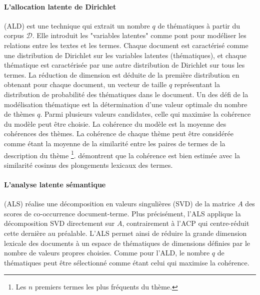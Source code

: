 \paragraph[LDA]{L'allocation latente de Dirichlet}
(ALD) \citep{blei2003lda} est une technique qui extrait un nombre $q$ de thématiques à partir du corpus $\mathcal{D}$. Elle introduit les "variables latentes" comme pont pour modéliser les relations entre les textes et les termes. Chaque document est caractérisé comme une distribution de Dirichlet sur les variables latentes (thématiques), et chaque thématique est caractérisée par une autre distribution de Dirichlet sur tous les termes. La réduction de dimension est déduite de la première distribution en obtenant pour chaque document, un vecteur de taille $q$ représentant la distribution de probabilité des thématiques dans le document. Un des défi de la modélisation thématique est la détermination d'une valeur optimale du nombre de thèmes $q$. Parmi plusieurs valeurs candidates, celle qui maximise la cohérence du modèle peut être choisie. La cohérence du modèle est la moyenne des  cohérences des thèmes. La cohérence de chaque thème peut être considérée comme étant la moyenne de la similarité entre les paires de termes de la description du thème \footnote{Les $n$ premiers termes les plus fréquents du thème.}. \citet{fang2016w2v_for_topiccoherence} démontrent que la cohérence est bien estimée avec la similarité cosinus des plongements lexicaux des termes.%

\paragraph[LSA]{L'analyse latente sémantique}
(ALS) \citep{dumais1988LSI, deerwester1990indexingbyLSA} réalise une décomposition en valeurs singulières (SVD) de la matrice $A$ des scores de co-occurrence document-terme. Plus précisément, l'ALS applique la décomposition SVD directement sur $A$, contrairement à l'ACP qui centre-réduit cette dernière au préalable. L'ALS permet ainsi de réduire la grande dimension lexicale des documents à un espace de thématiques de dimensions définies par le nombre de valeurs propres choisies. Comme pour l'ALD, le nombre $q$ de thématiques peut être sélectionné comme étant celui qui  maximise la cohérence. 

